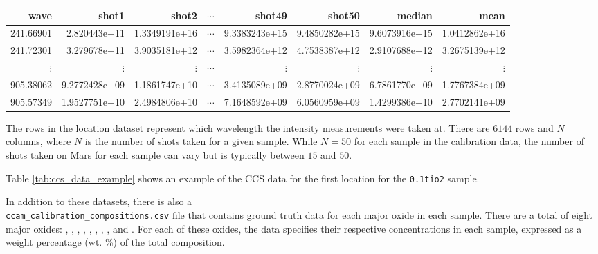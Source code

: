 \begin{table*}[!b]
\centering
\begin{tabular}{rrrrrrrr}
\toprule
     wave &         shot1 &         shot2 &  $\cdots$ &        shot49 &       shot50  & median        & mean          \\
\midrule
241.66901 & 2.820443e+11  & 1.3349191e+16 & $\cdots$  & 9.3383243e+15 & 9.4850282e+15 & 9.6073916e+15 & 1.0412862e+16 \\
241.72301 & 3.279678e+11  & 3.9035181e+12 & $\cdots$  & 3.5982364e+12 & 4.7538387e+12 & 2.9107688e+12 & 3.2675139e+12 \\
$\vdots$  & $\vdots$      & $\vdots$      & $\cdots$  & $\vdots$      & $\vdots$      & $\vdots$      & $\vdots$      \\
905.38062 & 9.2772428e+09 & 1.1861747e+10 & $\cdots$  & 3.4135089e+09 & 2.8770024e+09 & 6.7861770e+09 & 1.7767384e+09 \\
905.57349 & 1.9527751e+10 & 2.4984806e+10 & $\cdots$  & 7.1648592e+09 & 6.0560959e+09 & 1.4299386e+10 & 2.7702141e+09 \\
\bottomrule
\end{tabular}
\caption{Example of CCS data for the first sample in the \texttt{0.1tio2} directory.}
\label{tab:ccs_data_example}
\end{table*}

The rows in the location dataset represent which wavelength the intensity measurements were taken at.
There are $6144$ rows and $N$ columns, where $N$ is the number of shots taken for a given sample.
While $N=50$ for each sample in the calibration data, the number of shots taken on Mars for each sample can vary but is typically between $15$ and $50$.

Table \ref{tab:ccs_data_example} shows an example of the CCS data for the first location for the \texttt{0.1tio2} sample.

In addition to these datasets, there is also a \\ \texttt{ccam\_calibration\_compositions.csv} file that contains ground truth data for each major oxide in each sample.
There are a total of eight major oxides: , , , , , , , , and .
For each of these oxides, the data specifies their respective concentrations in each sample, expressed as a weight percentage (wt. \%) of the total composition.